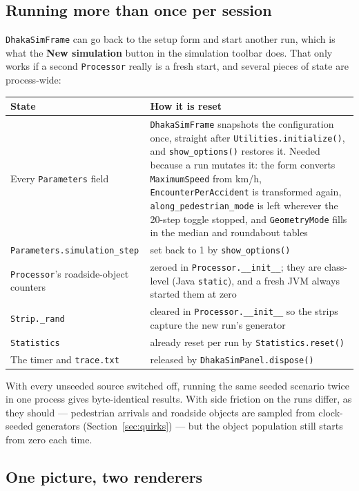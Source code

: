 \documentclass[11pt, a4paper]{article}
\newcommand{\code}[1]{\texttt{#1}}
\begin{document}
\subsection{Running more than once per session}
\label{sec:rerun}

\code{DhakaSimFrame} can go back to the setup form and start another run, which
is what the \textbf{New simulation} button in the simulation toolbar does. That
only works if a second \code{Processor} really is a fresh start, and several
pieces of state are process-wide:

\begin{center}
\begin{tabularx}{\textwidth}{l X}
\toprule
\textbf{State} & \textbf{How it is reset} \\
\midrule
Every \code{Parameters} field & \code{DhakaSimFrame} snapshots the configuration once, straight after \code{Utilities.initialize()}, and \code{show\_options()} restores it. Needed because a run mutates it: the form converts \code{MaximumSpeed} from km/h, \code{EncounterPerAccident} is transformed again, \code{along\_pedestrian\_mode} is left wherever the 20-step toggle stopped, and \code{GeometryMode} fills in the median and roundabout tables \\
\code{Parameters.simulation\_step} & set back to 1 by \code{show\_options()} \\
\code{Processor}'s roadside-object counters & zeroed in \code{Processor.\_\_init\_\_}; they are class-level (Java \code{static}), and a fresh JVM always started them at zero \\
\code{Strip.\_rand} & cleared in \code{Processor.\_\_init\_\_} so the strips capture the new run's generator \\
\code{Statistics} & already reset per run by \code{Statistics.reset()} \\
The timer and \code{trace.txt} & released by \code{DhakaSimPanel.dispose()} \\
\bottomrule
\end{tabularx}
\end{center}

With every unseeded source switched off, running the same seeded scenario twice
in one process gives byte-identical results. With side friction on the runs
differ, as they should --- pedestrian arrivals and roadside objects are sampled
from clock-seeded generators (Section~\ref{sec:quirks}) --- but the object
population still starts from zero each time.

\subsection{One picture, two renderers}
\label{sec:onepicture}
\end{document}
